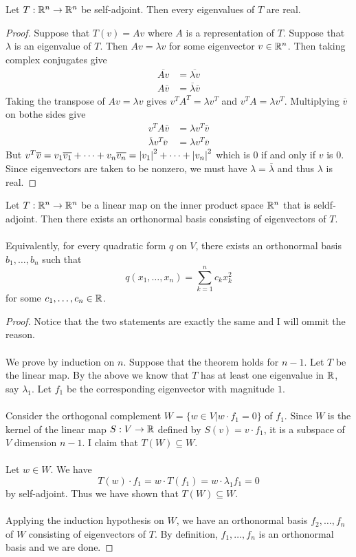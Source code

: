 \documentclass[a4paper]{article}
\begin{document}
\begin{prp}{}{} Let $T:\mathbb{R}^n\to\mathbb{R}^n$ be self-adjoint. Then every eigenvalues of $T$ are real. \tcbline
\begin{proof}
Suppose that $T(v)=Av$ where $A$ is a representation of $T$. Suppose that $\lambda$ is an eigenvalue of $T$. Then $Av=\lambda v$ for some eigenvector $v\in\mathbb{R}^n$. Then taking complex conjugates give 
\begin{align*}
\overline{Av}&=\overline{\lambda v}\\
A\overline{v}&=\overline{\lambda}\overline{v}
\end{align*}
Taking the transpose of $Av=\lambda v$ gives $v^TA^T=\lambda v^T$ and $v^TA=\lambda v^T$. Multiplying $\overline{v}$ on bothe sides give 
\begin{align*}
v^TA\overline{v}&=\lambda v^T\overline{v}\\
\overline{\lambda}v^T\overline{v}&=\lambda v^T\overline{v}
\end{align*}
But $v^T\overline{v}=v_1\overline{v_1}+\dots+v_n\overline{v_n}=\abs{v_1}^2+\dots+\abs{v_n}^2$ which is $0$ if and only if $v$ is $0$. Since eigenvectors are taken to be nonzero, we must have $\lambda=\overline{\lambda}$ and thus $\lambda$ is real. 
\end{proof}
\end{prp}

\begin{thm}{}{} Let $T:\mathbb{R}^n\to\mathbb{R}^n$ be a linear map on the inner product space $\mathbb{R}^n$ that is seldf-adjoint. Then there exists an orthonormal basis consisting of eigenvectors of $T$. \\~\\
Equivalently, for every quadratic form $q$ on $V$, there exists an orthonormal basis $b_1,\dots,b_n$ such that $$q(x_1,\dots,x_n)=\sum_{k=1}^nc_kx_k^2$$ for some $c_1,\dots,c_n\in\mathbb{R}$. \tcbline
\begin{proof}
Notice that the two statements are exactly the same and I will ommit the reason. \\~\\
We prove by induction on $n$. Suppose that the theorem holds for $n-1$. Let $T$ be the linear map. By the above we know that $T$ has at least one eigenvalue in $\mathbb{R}$, say $\lambda_1$. Let $f_1$ be the corresponding eigenvector with magnitude $1$. \\~\\
Consider the orthogonal complement $W=\{w\in V|w\cdot f_1=0\}$ of $f_1$. Since $W$ is the kernel of the linear map $S:V\to\mathbb{R}$ defined by $S(v)=v\cdot f_1$, it is a subspace of $V$ dimension $n-1$. I claim that $T(W)\subseteq W$. \\~\\
Let $w\in W$. We have $$T(w)\cdot f_1=w\cdot T(f_1)=w\cdot\lambda_1f_1=0$$ by self-adjoint. Thus we have shown that $T(W)\subseteq W$. \\~\\
Applying the induction hypothesis on $W$, we have an orthonormal basis $f_2,\dots,f_n$ of $W$ consisting of eigenvectors of $T$. By definition, $f_1,\dots,f_n$ is an orthonormal basis and we are done. 
\end{proof}
\end{thm}
\end{document}
